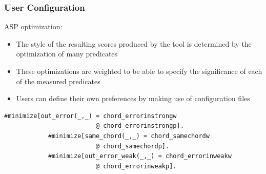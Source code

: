 \documentclass[english]{beamer}
\begin{document}
	\begin{frame}[fragile]
	\frametitle{User Configuration}
		ASP optimization:
		\begin{itemize}
			\item The \alert{style} of the resulting scores produced by the tool is determined by the optimization of many predicates
			\pause
			\item These optimizations are \alert{weighted} to be able to specify the significance of each of the measured predicates
			\pause
			\item Users can \alert{define their own preferences} by making use of configuration files
		\end{itemize}
		\begin{Verbatim}[frame=single]
			#minimize[out_error(_,_) = chord_errorinstrongw 
                         @ chord_errorinstrongp].
			#minimize[same_chord(_,_) = chord_samechordw
                         @ chord_samechordp].
			#minimize[out_error_weak(_,_) = chord_errorinweakw 
                         @ chord_errorinweakp].
		\end{Verbatim}
	\end{frame}
\end{document}
